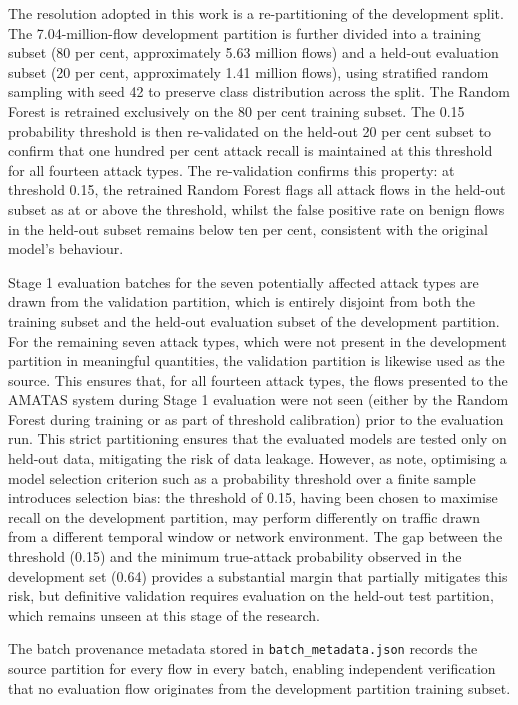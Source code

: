 \documentclass[../main.tex]{subfiles}
\begin{document}
The resolution adopted in this work is a re-partitioning of the development split. The 7.04-million-flow development partition is further divided into a training subset (80 per cent, approximately 5.63 million flows) and a held-out evaluation subset (20 per cent, approximately 1.41 million flows), using stratified random sampling with seed 42 to preserve class distribution across the split. The Random Forest is retrained exclusively on the 80 per cent training subset. The 0.15 probability threshold is then re-validated on the held-out 20 per cent subset to confirm that one hundred per cent attack recall is maintained at this threshold for all fourteen attack types. The re-validation confirms this property: at threshold 0.15, the retrained Random Forest flags all attack flows in the held-out subset as at or above the threshold, whilst the false positive rate on benign flows in the held-out subset remains below ten per cent, consistent with the original model's behaviour.

Stage 1 evaluation batches for the seven potentially affected attack types are drawn from the validation partition, which is entirely disjoint from both the training subset and the held-out evaluation subset of the development partition. For the remaining seven attack types, which were not present in the development partition in meaningful quantities, the validation partition is likewise used as the source. This ensures that, for all fourteen attack types, the flows presented to the AMATAS system during Stage 1 evaluation were not seen (either by the Random Forest during training or as part of threshold calibration) prior to the evaluation run. This strict partitioning ensures that the evaluated models are tested only on held-out data, mitigating the risk of data leakage. However, as \textcite{Cawley2010} note, optimising a model selection criterion such as a probability threshold over a finite sample introduces selection bias: the threshold of 0.15, having been chosen to maximise recall on the development partition, may perform differently on traffic drawn from a different temporal window or network environment. The gap between the threshold (0.15) and the minimum true-attack probability observed in the development set (0.64) provides a substantial margin that partially mitigates this risk, but definitive validation requires evaluation on the held-out test partition, which remains unseen at this stage of the research.

The batch provenance metadata stored in \texttt{batch\_metadata.json} records the source partition for every flow in every batch, enabling independent verification that no evaluation flow originates from the development partition training subset.
\end{document}
